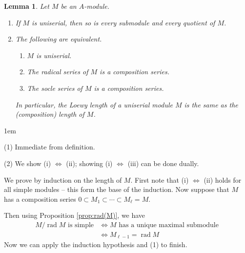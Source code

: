 \documentclass[11pt,a4paper]{article}
\makeatletter
\numberwithin{equation}{section}
\renewenvironment{proof}[1][\proofname]{\par
    \pushQED{\qed}%
    \normalfont \topsep0\p@\@plus6\p@ \labelsep1em\relax
    \trivlist
    \item[\hskip\labelsep\indent
        \bfseries #1]\ignorespaces
    \mbox{}
}{
    \popQED\endtrivlist\@endpefalse
}
\theoremstyle{all}
\newtheorem{lemma}[theorem]{Lemma}
\theoremstyle{remark}
\newcommand{\rad}{\operatorname{rad}\nolimits}
\makeatother
\begin{document}
\begin{lemma}\label{lem:uniserial basic}
Let $M$ be an $A$-module.

\begin{enumerate}
\item If $M$ is uniserial, then so is every submodule and every quotient of $M$.

\item The following are equivalent.
\begin{enumerate}[\rm (i)]
\item $M$ is uniserial.
\item The radical series of $M$ is a composition series.
\item The socle series of $M$ is a composition series.
\end{enumerate}
In particular, the Loewy length of a uniserial module $M$ is the same as the (composition) length of $M$.
\end{enumerate}
\end{lemma}
\begin{proof}
(1) Immediate from definition.

(2) We show (i) $\Leftrightarrow$ (ii); showing (i) $\Leftrightarrow$ (iii) can be done dually.

We prove by induction on the length of $M$.
First note that (i) $\Leftrightarrow$ (ii) holds for all simple modules -- this form the base of the induction.  Now suppose that $M$ has a composition series $0\subset M_1 \subset\cdots \subset M_\ell = M$.

Then using Proposition \ref{prop:rad(M)}, we have
\begin{align*}
M/\rad M \text{ is simple} &\Leftrightarrow M \text{ has a unique maximal submodule} \\ 
& \Leftrightarrow M_{\ell-1} = \rad M
\end{align*}
Now we can apply the induction hypothesis and (1) to finish.
\end{proof}
\end{document}
